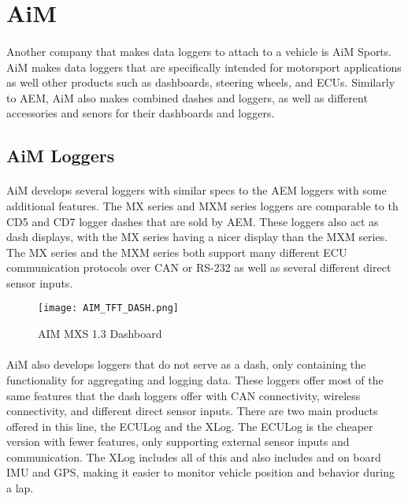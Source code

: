 \section{AiM}

\paragraph{}
Another company that makes data loggers to attach to a vehicle is AiM Sports.
AiM makes data loggers that are specifically intended for motorsport applications as well other products such as dashboards, steering wheels, and ECUs.
Similarly to AEM, AiM also makes combined dashes and loggers, as well as different accessories and senors for their dashboards and loggers.

\subsection{AiM Loggers}

\paragraph{}
AiM develops several loggers with similar specs to the AEM loggers with some additional features.
The MX series and MXM series loggers are comparable to th CD5 and CD7 logger dashes that are sold by AEM.
These loggers also act as dash displays, with the MX series having a nicer display than the MXM series.
The MX series and the MXM series both support many different ECU communication protocols over CAN or RS-232 as well as several different direct sensor inputs.

\begin{figure}[H]
	\centering
	\texttt{[image: AIM\_TFT\_DASH.png]}
	\caption{AIM MXS 1.3 Dashboard}
	\label{fig:AIM_TFT}
\end{figure}

\paragraph{}
AiM also develops loggers that do not serve as a dash, only containing the functionality for aggregating and logging data.
These loggers offer most of the same features that the dash loggers offer with CAN connectivity, wireless connectivity, and different direct sensor inputs.
There are two main products offered in this line, the ECULog and the XLog.
The ECULog is the cheaper version with fewer features, only supporting external sensor inputs and communication.
The XLog includes all of this and also includes and on board IMU and GPS, making it easier to monitor vehicle position and behavior during a lap.

